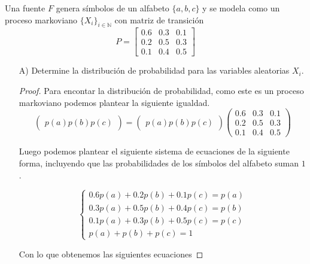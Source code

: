 
Una fuente $F$ genera símbolos de un alfabeto $\{a, b, c\}$ y se modela como un proceso markoviano $\{X_i\}_{i \in \mathbb{N}}$ con matriz de transición
\begin{equation*}
    P = \begin{bmatrix} 0\text{.}6 & 0\text{.}3 & 0\text{.}1 \\ 0\text{.}2 & 0\text{.}5 & 0\text{.}3 \\ 0\text{.}1 & 0\text{.}4 & 0\text{.}5 \end{bmatrix}
\end{equation*}

\begin{itemize}
    \item[A)] Determine la distribución de probabilidad para las variables aleatorias $X_i$.
    \begin{proof}
    Para encontar la distribución de probabilidad, como este es un proceso markoviano podemos plantear la siguiente igualdad.\\

$$
\begin{pmatrix}
p(a)
p(b) 
p(c)
\end{pmatrix}
=
\begin{pmatrix}
p(a) 
p(b) 
p(c)
\end{pmatrix}
\begin{pmatrix}
0.6 & 0.3 & 0.1 \\
0.2 & 0.5 & 0.3 \\
0.1 & 0.4 & 0.5
\end{pmatrix}
$$

Luego podemos plantear el siguiente sistema de ecuaciones de la siguiente forma, incluyendo que las probabilidades de los símbolos del alfabeto suman $1$.

$$
\begin{cases}
0.6p(a) + 0.2p(b) + 0.1p(c) = p(a) \\
0.3p(a) + 0.5p(b) + 0.4p(c) = p(b) \\
0.1p(a) + 0.3p(b) + 0.5p(c) = p(c) \\
p(a) + p(b) + p(c) = 1
\end{cases}
$$

Con lo que obtenemos las siguientes ecuaciones


\end{proof}
\end{itemize}
